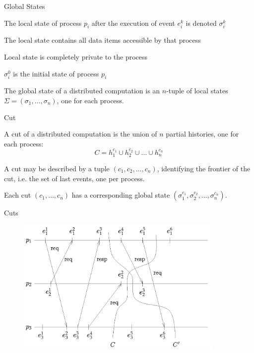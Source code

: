 \begin{frame}{Global States}
	
\begin{definition}
\BI
\item The \alert{local state} of process $p_i$ after the execution of
  event $e_i^k$ is denoted $\sigma_i^k$
\item The local state contains all data items accessible by that process
\item Local state is completely private to the process
\item $\sigma_i^0$ is the \alert{initial state} of process $p_i$
\EI
\end{definition}
\bigskip
\begin{definition}
The \alert{global state} of a distributed computation is an $n$-tuple of local
  states $\Sigma = (\sigma_1, \ldots, \sigma_n)$, one for each process.
\end{definition}

\end{frame}

\begin{frame}{Cut}

\begin{definition}[Cut]
A \alert{cut} of a distributed computation is the union of $n$ partial
  histories, one for each process:
\[
  C = h_1^{c_1} \cup h_2^{c_2} \cup \ldots \cup h_n^{c_n}
\]
\end{definition}

\bigskip
\BIL
\item A cut may be described by a tuple $(c_1, c_2, \ldots, c_n)$, 
  identifying the \alert{frontier} of the cut, i.e. the set of last events,
  one per process.
\item Each cut $(c_1, \ldots, c_n)$ has a corresponding global state
$(\sigma_1^{c_1}, \sigma_2^{c_2}, \ldots, \sigma_n^{c_n})$.
\EIL
\end{frame}

\begin{frame}{Cuts}

\begin{figure} 
\includegraphics[width=10cm]{figs/02/figure-2}
\end{figure}
\end{frame}

